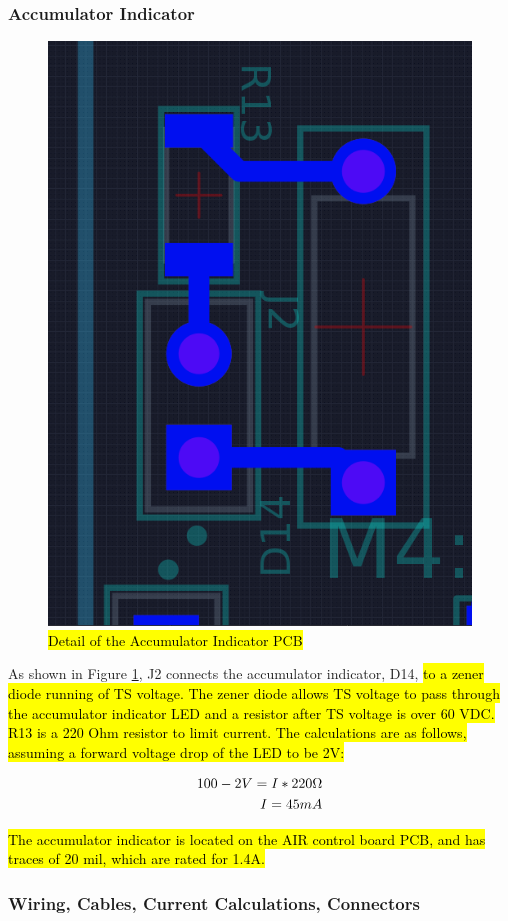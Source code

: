 \documentclass{article}
\DeclareRobustCommand{\hlr}[1]{{\sethlcolor{red}\hl{#1}}}
\begin{document}
        \subsubsection{Accumulator Indicator} \label{aindicator}


            \begin{figure}[H]
                \centering
                \includegraphics[width = 0.3 \textwidth]{ai}
                \caption{\hlr{Detail of the Accumulator Indicator PCB}}
                \label{indicator}
            \end{figure}

            As shown in Figure \ref{indicator}, J2 connects the accumulator indicator, D14, \hlr{to a zener diode running of TS voltage. The zener diode allows TS voltage to pass through the accumulator indicator LED and a resistor after TS voltage is over 60 VDC.  R13 is a 220 Ohm resistor to limit current. The calculations are as follows, assuming a forward voltage drop of the LED to be 2V:}

            \begin{align}
                100-2 V = I * 220 \ohm \\
                I = 45 mA
            \end{align}

            \hlr{The accumulator indicator is located on the AIR control board PCB, and has traces of 20 mil, which are rated for 1.4A. }

        \subsubsection{Wiring, Cables, Current Calculations, Connectors} \label{batteryconnectors}
\end{document}
